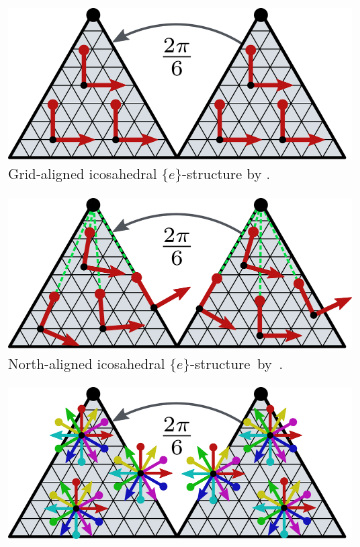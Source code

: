\begin{figure}
    \centering
    \begin{subfigure}[b]{0.31\textwidth}
        \centering
        \includegraphics[width=1.\textwidth]{figures/icosahedron_G_structure_1.pdf}
        \vspace*{-6pt}
        \captionsetup{width=.9\textwidth}
        \caption{\small
            Grid-aligned icosahedral $\{e\}$-structure by \citet{liu2018icoAltAz}.
        }
        \label{fig:G_structure_ico_1}
    \end{subfigure}
    \hfill
    \begin{subfigure}[b]{0.31\textwidth}
        \centering
        \includegraphics[width=1.\textwidth]{figures/icosahedron_G_structure_2.pdf}
        \vspace*{-6pt}
        \captionsetup{width=.9\textwidth}
        \caption{\small
            North-aligned icosahedral \mbox{$\{e\}$-structure by \citet{zhang2019orientation}}.
        }
        \label{fig:G_structure_ico_2}
    \end{subfigure}
    \hfill
    \begin{subfigure}[b]{0.31\textwidth}
        \centering
        \includegraphics[width=1.\textwidth]{figures/icosahedron_G_structure_3.pdf}

\end{subfigure}
\end{figure}
